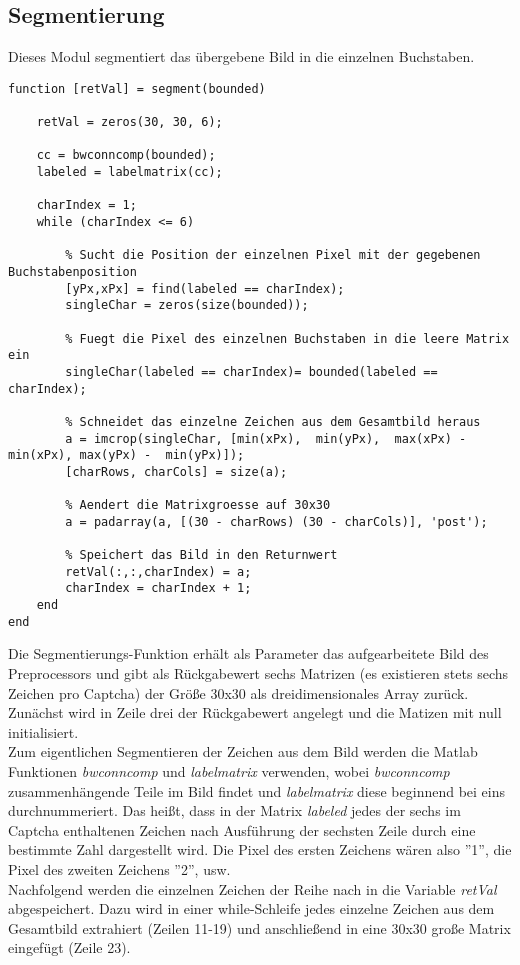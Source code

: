 \subsection{Segmentierung}
Dieses Modul segmentiert das übergebene Bild in die einzelnen Buchstaben.
\begin{lstlisting}
function [retVal] = segment(bounded)

    retVal = zeros(30, 30, 6);

    cc = bwconncomp(bounded);
    labeled = labelmatrix(cc);
  
    charIndex = 1;
    while (charIndex <= 6)

        % Sucht die Position der einzelnen Pixel mit der gegebenen Buchstabenposition
        [yPx,xPx] = find(labeled == charIndex);
        singleChar = zeros(size(bounded)); 

        % Fuegt die Pixel des einzelnen Buchstaben in die leere Matrix ein
        singleChar(labeled == charIndex)= bounded(labeled == charIndex); 

        % Schneidet das einzelne Zeichen aus dem Gesamtbild heraus
        a = imcrop(singleChar, [min(xPx),  min(yPx),  max(xPx) - min(xPx), max(yPx) -  min(yPx)]);
        [charRows, charCols] = size(a);

        % Aendert die Matrixgroesse auf 30x30
        a = padarray(a, [(30 - charRows) (30 - charCols)], 'post');
        
        % Speichert das Bild in den Returnwert
        retVal(:,:,charIndex) = a;
        charIndex = charIndex + 1;
    end
end
\end{lstlisting}
Die Segmentierungs-Funktion erhält als Parameter das aufgearbeitete Bild des Preprocessors und gibt als Rückgabewert sechs Matrizen (es existieren stets sechs Zeichen pro Captcha) der Größe 30x30 als dreidimensionales Array zurück.\\
Zunächst wird in Zeile drei der Rückgabewert angelegt und die Matizen mit null initialisiert.\\
Zum eigentlichen Segmentieren der Zeichen aus dem Bild werden die Matlab Funktionen \textit{bwconncomp} und \textit{labelmatrix} verwenden, wobei \textit{bwconncomp} zusammenhängende Teile im Bild findet und \textit{labelmatrix} diese beginnend bei eins durchnummeriert. Das heißt, dass in der Matrix \textit{labeled} jedes der sechs im Captcha enthaltenen Zeichen nach Ausführung der sechsten Zeile durch eine bestimmte Zahl dargestellt wird. Die Pixel des ersten Zeichens wären also ''1'', die Pixel des zweiten Zeichens ''2'', usw.\\
Nachfolgend werden die einzelnen Zeichen der Reihe nach in die Variable \textit{retVal} abgespeichert. Dazu wird in einer while-Schleife jedes einzelne Zeichen aus dem Gesamtbild extrahiert (Zeilen 11-19) und anschließend in eine 30x30 große Matrix eingefügt (Zeile 23). 
\newpage
